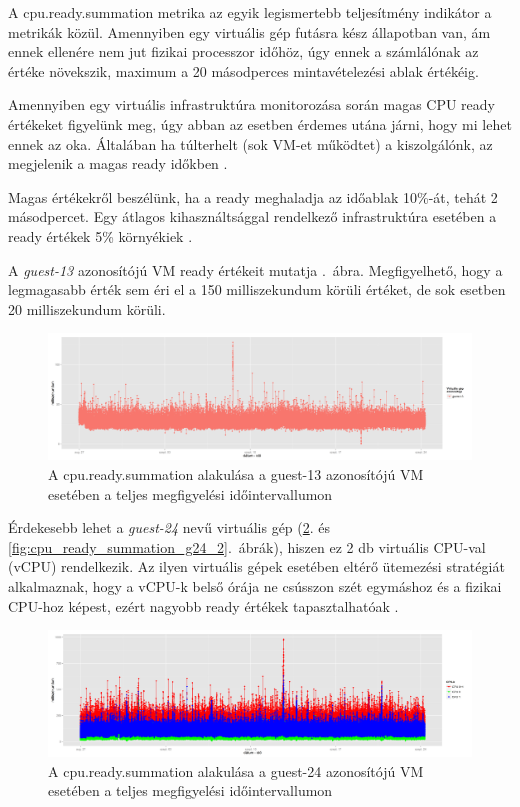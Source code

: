 \documentclass[a4paper,10pt,titlepage]{article}
\begin{document}
A cpu.ready.summation metrika az egyik legismertebb teljesítmény indikátor a metrikák közül. Amennyiben egy virtuális gép futásra kész állapotban van, ám ennek ellenére nem jut fizikai processzor időhöz, úgy ennek a számlálónak az értéke növekszik, maximum a 20 másodperces mintavételezési ablak értékéig.

Amennyiben egy virtuális infrastruktúra monitorozása során magas CPU ready értékeket figyelünk meg, úgy abban az esetben érdemes utána járni, hogy mi lehet ennek az oka. Általában ha túlterhelt (sok VM-et működtet) a kiszolgálónk, az megjelenik a magas ready időkben \cite{link:VPM}.

Magas értékekről beszélünk, ha a ready meghaladja az időablak 10\%-át, tehát 2 másodpercet. Egy átlagos kihasználtsággal rendelkező infrastruktúra esetében a ready értékek 5\% környékiek \cite{link:CRT}.

A \textit{guest-13} azonosítójú VM ready értékeit mutatja .~ábra. Megfigyelhető, hogy a legmagasabb érték sem éri el a 150 milliszekundum körüli értéket, de sok esetben 20 milliszekundum körüli.

\begin{figure}[ht!]
\centering
\includegraphics[width=1.00\textwidth]{figures/cpu_ready_summation-guest-13-20120826230140-20120924083120.png}
\caption{A cpu.ready.summation alakulása a guest-13 azonosítójú VM esetében a teljes megfigyelési időintervallumon \label{fig:cpu_ready_summation_g13}}
\end{figure}

Érdekesebb lehet a \textit{guest-24} nevű virtuális gép (\ref{fig:cpu_ready_summation_g24_1}. és \ref{fig:cpu_ready_summation_g24_2}.~ábrák), hiszen ez 2 db virtuális CPU-val (vCPU) rendelkezik. Az ilyen virtuális gépek esetében eltérő ütemezési stratégiát alkalmaznak, hogy a vCPU-k belső órája ne csússzon szét egymáshoz és a fizikai CPU-hoz képest, ezért nagyobb ready értékek tapasztalhatóak \cite{link:VMCS}.

\begin{figure}[ht!]
\centering
\includegraphics[width=1.00\textwidth]{figures/cpu_ready_summation-guest-24-20120826230140-20120924083120.png}
\caption{A cpu.ready.summation alakulása a guest-24 azonosítójú VM esetében a teljes megfigyelési időintervallumon \label{fig:cpu_ready_summation_g24_1}}
\end{figure}
\end{document}
